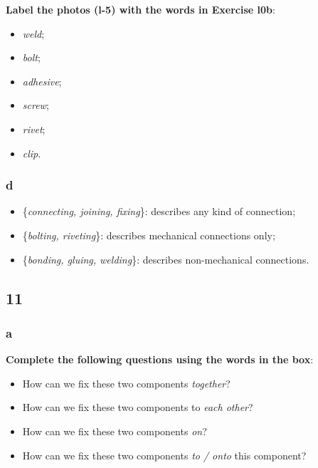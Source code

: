 \textbf{Label the photos (l-5) with the words in Exercise l0b}:

\begin{itemize}

\item\textit{weld};
\item\textit{bolt};
\item\textit{adhesive};
\item\textit{screw};
\item\textit{rivet};
\item\textit{clip}.

\end{itemize}

\subsubsection{d}

\begin{itemize}

\item \{\textit{connecting, joining, fixing}\}: describes any kind of connection;
\item \{\textit{bolting, riveting}\}: describes mechanical connections only;
\item \{\textit{bonding, gluing, welding}\}: describes non-mechanical connections.

\end{itemize}

\subsection{11}

\subsubsection{a}

\textbf{Complete the following questions using the words in the box}:

\begin{itemize}

\item How can we fix these two components \textit{together}?
\item How can we fix these two components to \textit{each other}?
\item How can we fix these two components \textit{on}?
\item How can we fix these two components \textit{to / onto} this component?

\end{itemize}

